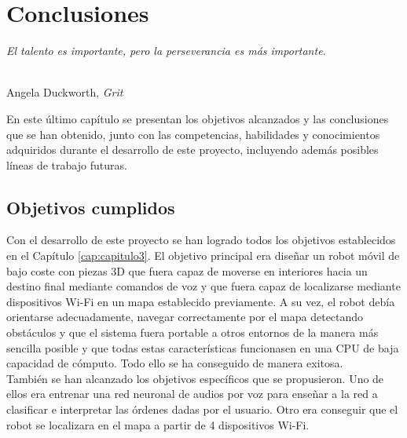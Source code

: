 \chapter{Conclusiones}
\label{cap:capitulo5}

\begin{flushright}
\begin{minipage}[]{10cm}
\emph{El talento es importante, pero la perseverancia es más importante.}\\
\end{minipage}\\

Angela Duckworth, \textit{Grit}\\
\end{flushright}

\vspace{1cm}

En este último capítulo se presentan los objetivos alcanzados y las conclusiones que se han obtenido, junto con las competencias, habilidades y conocimientos adquiridos durante el desarrollo de este proyecto, incluyendo además posibles líneas de trabajo futuras.


\section{Objetivos cumplidos}
\label{sec:objetivos_cumplidos}


Con el desarrollo de este proyecto se han logrado todos los objetivos establecidos en el Capítulo \ref{cap:capitulo3}. El objetivo principal era diseñar un robot móvil de bajo coste con piezas 3D que fuera capaz de moverse en interiores hacia un destino final mediante comandos de voz y que fuera capaz de localizarse mediante dispositivos Wi-Fi en un mapa establecido previamente. A su vez, el robot debía orientarse adecuadamente, navegar correctamente por el mapa detectando obstáculos y que el sistema fuera portable a otros entornos de la manera más sencilla posible y que todas estas características funcionasen en una CPU de baja capacidad de cómputo. Todo ello se ha conseguido de manera exitosa.\\


También se han alcanzado los objetivos específicos que se propusieron. Uno de ellos era entrenar una red neuronal de audios por voz para enseñar a la red a clasificar e interpretar las órdenes dadas por el usuario. Otro era conseguir que el robot se localizara en el mapa a partir de 4 dispositivos Wi-Fi.\\

